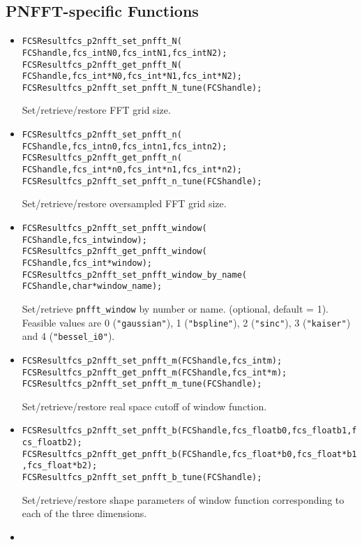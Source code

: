 \subsection{PNFFT-specific Functions}
\begin{itemize}
  \item
\begin{alltt}
FCSResult fcs_p2nfft_set_pnfft_N(
    FCS handle, fcs_int N0, fcs_int N1, fcs_int N2);
FCSResult fcs_p2nfft_get_pnfft_N(
    FCS handle, fcs_int* N0, fcs_int* N1, fcs_int* N2);
FCSResult fcs_p2nfft_set_pnfft_N_tune(FCS handle);
\end{alltt}
    Set/retrieve/restore FFT grid size.
  \item
\begin{alltt}
FCSResult fcs_p2nfft_set_pnfft_n(
    FCS handle, fcs_int n0, fcs_int n1, fcs_int n2);
FCSResult fcs_p2nfft_get_pnfft_n(
    FCS handle, fcs_int* n0, fcs_int* n1, fcs_int* n2);
FCSResult fcs_p2nfft_set_pnfft_n_tune(FCS handle);
\end{alltt}
    Set/retrieve/restore oversampled FFT grid size.
  \item
\begin{alltt}
FCSResult fcs_p2nfft_set_pnfft_window(
    FCS handle, fcs_int window);
FCSResult fcs_p2nfft_get_pnfft_window(
    FCS handle, fcs_int* window);
FCSResult fcs_p2nfft_set_pnfft_window_by_name(
    FCS handle, char* window_name );
\end{alltt}
    Set/retrieve \verb!pnfft_window! by number or name. (optional, default = 1).
    Feasible values are 0 (\verb!"gaussian"!), 1 (\verb!"bspline"!), 2 (\verb!"sinc"!), 3 (\verb!"kaiser"!) and 4 (\verb!"bessel_i0"!).
  \item
\begin{alltt}
FCSResult fcs_p2nfft_set_pnfft_m(FCS handle, fcs_int m);
FCSResult fcs_p2nfft_get_pnfft_m(FCS handle, fcs_int* m);
FCSResult fcs_p2nfft_set_pnfft_m_tune(FCS handle);
\end{alltt}
    Set/retrieve/restore real space cutoff of window function.
  \item
\begin{alltt}
FCSResult fcs_p2nfft_set_pnfft_b(FCS handle, fcs_float b0, fcs_float b1, fcs_float b2);
FCSResult fcs_p2nfft_get_pnfft_b(FCS handle, fcs_float* b0, fcs_float* b1, fcs_float* b2);
FCSResult fcs_p2nfft_set_pnfft_b_tune(FCS handle);
\end{alltt}
    Set/retrieve/restore shape parameters of window function corresponding to each of the three dimensions.
  \item

\end{itemize}
